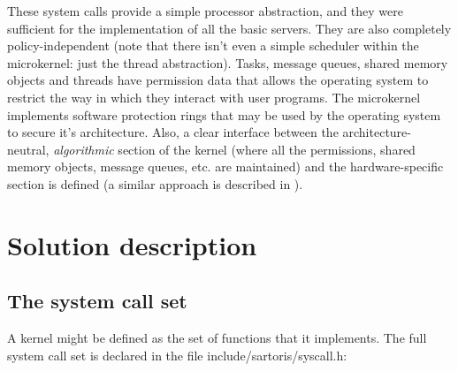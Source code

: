 \documentclass[12pt, letterpaper, oneside, english]{article}
\begin{document}
These system calls provide a simple processor abstraction, and they were sufficient for the implementation of all the basic servers. They are also completely policy-independent (note that there isn't even a simple scheduler within the microkernel: just the thread abstraction). Tasks, message queues, shared memory objects and threads have permission data that allows the operating system to restrict the way in which they interact with user programs. The microkernel implements software protection rings that may be used by the operating system to secure it's architecture. Also, a clear interface between the architecture-neutral, \emph{algorithmic} section of the kernel (where all the permissions, shared memory objects, message queues, etc. are maintained) and the hardware-specific section is defined (a similar approach is described in \cite{Tang}).

\section{Solution description}

\subsection{The system call set}
A kernel might be defined as the set of functions that it implements. The full system call set is declared in the file \textsf{include/sartoris/syscall.h}:
\end{document}

